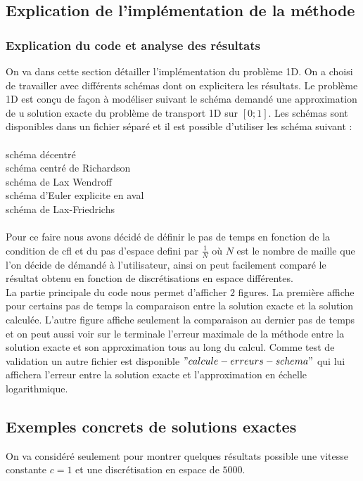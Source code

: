 \documentclass[12pt]{article}
\begin{document}
\subsection{Explication de l'implémentation de la méthode}
\subsubsection{Explication du code et analyse des résultats}
On va dans cette section détailler l'implémentation du problème 1D.
On a choisi de travailler  avec différents schémas dont on explicitera les résultats.
Le problème 1D est conçu de façon à modéliser suivant le schéma demandé une approximation de u solution exacte du problème de transport 1D sur $[0;1]$.
Les schémas sont disponibles dans un fichier séparé et il est possible d'utiliser les schéma suivant :
\\
\\schéma décentré
\\schéma centré de Richardson
\\schéma de Lax Wendroff
\\schéma d'Euler explicite en aval
\\schéma de Lax-Friedrichs
\\
\\Pour ce faire nous avons décidé de définir le pas de temps en fonction de la condition de cfl et du pas d'espace defini par $\frac{1}{N}$ où $N$ est le nombre de maille que l'on décide de démandé à l'utilisateur, ainsi on peut facilement comparé le résultat obtenu en fonction de discrétisations en espace différentes.
\\La partie principale du code nous permet d'afficher $2$ figures. La première affiche pour certains pas de temps la comparaison entre la solution exacte et la solution calculée. L'autre figure affiche seulement la comparaison au dernier pas de temps et on peut aussi voir sur le terminale l'erreur maximale de la méthode entre la solution exacte et son approximation tous au long du calcul. Comme test de validation un autre fichier est disponible $"calcule-erreurs -schema"$ qui lui affichera l'erreur entre la solution exacte et l'approximation en échelle logarithmique.
\subsection{Exemples concrets de solutions exactes}
On va considéré seulement pour montrer quelques résultats possible une vitesse constante $c=1$ et une discrétisation en espace de $5000$.
\end{document}
